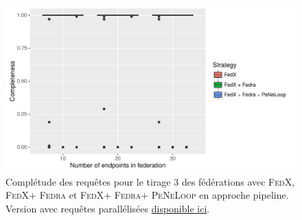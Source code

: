 \documentclass[a4paper]{article}
\def\fedra{\textsc{Fedra}\xspace}
\def\fedx{\textsc{FedX}\xspace}
\def\peneloop{\textsc{PeNeLoop}\xspace}
\newcommand{\parallelLink}[1]{Version avec requêtes parallélisées \href{#1}{disponible ici}.}
\begin{document}
\begin{figure}[h]
    \centering
    \includegraphics{boxplots/fed3_completeness.pdf}
    \caption{Complétude des requêtes pour le tirage 3 des fédérations avec \fedx, \fedx + \fedra et \fedx + \fedra + \peneloop en approche pipeline. \parallelLink{https://github.com/Callidon/ParallelNestedLoop/blob/master/results/definitive/fed3_pll_completeness.pdf}}
    \label{fig:fed3_compl}
\end{figure}
\end{document}
